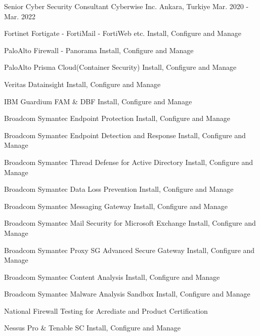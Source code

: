 \begin{cventries}
  \cventry
    {Senior Cyber Security Consultant} %
    {Cyberwise Inc.} %
    {Ankara, Turkiye} %
    {Mar. 2020 - Mar. 2022} %
    {
      \begin{cvitems} %
        \item {Fortinet Fortigate - FortiMail - FortiWeb etc. Install, Configure and Manage}
        \item {PaloAlto Firewall - Panorama Install, Configure and Manage}
        \item {PaloAlto Prisma Cloud(Container Security) Install, Configure and Manage}
        \item {Veritas Datainsight Install, Configure and Manage}
        \item {IBM Guardium FAM \& DBF Install, Configure and Manage}
        \item {Broadcom Symantec Endpoint Protection Install, Configure and Manage}
        \item {Broadcom Symantec Endpoint Detection and Response Install, Configure and Manage}
        \item {Broadcom Symantec Thread Defense for Active Directory Install, Configure and Manage}   
        \item {Broadcom Symantec Data Loss Prevention Install, Configure and Manage}
        \item {Broadcom Symantec Messaging Gateway Install, Configure and Manage}
        \item {Broadcom Symantec Mail Security for Microsoft Exchange Install, Configure and Manage}
        \item {Broadcom Symantec Proxy SG Advanced Secure Gateway Install, Configure and Manage}
        \item {Broadcom Symantec Content Analysis Install, Configure and Manage}
        \item {Broadcom Symantec Malware Analysis Sandbox Install, Configure and Manage}
        \item {National Firewall Testing for Acrediate and Product Certification}
        \item {Nessus Pro \& Tenable SC Install, Configure and Manage}
      \end{cvitems}
    }
    

\end{cventries}
